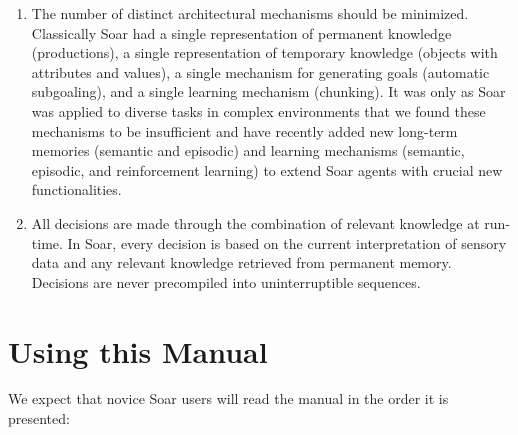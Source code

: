 \begin{enumerate} 
\item The number of distinct architectural mechanisms should be minimized.
        Classically Soar had a single representation of permanent knowledge
        (productions), a single representation of temporary knowledge (objects
        with attributes and values), a single mechanism for generating goals
        (automatic subgoaling), and a single learning mechanism (chunking).
        It was only as Soar was applied to diverse tasks in complex environments that 
        we found these mechanisms to be insufficient and have recently added new 
        long-term memories (semantic and episodic) and learning mechanisms
        (semantic, episodic, and reinforcement learning) to extend Soar agents
        with crucial new functionalities.
\vspace{-6pt}

\item All decisions are made through the combination of relevant knowledge at
        run-time.  In Soar, every decision is based on the current
        interpretation of sensory data and any relevant knowledge retrieved
        from permanent memory.  Decisions are never precompiled into
        uninterruptible sequences.
\end{enumerate}


\section{Using this Manual}


We expect that novice Soar users will read the manual in the order it is
presented: 

